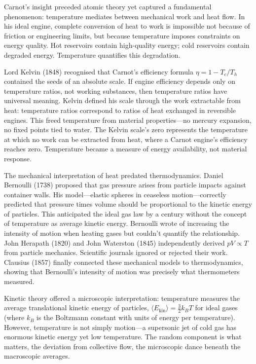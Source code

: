 Carnot's insight preceded atomic theory yet captured a fundamental phenomenon: temperature mediates between mechanical work and heat flow. In his ideal engine, complete conversion of heat to work is impossible not because of friction or engineering limits, but because temperature imposes constraints on energy quality. Hot reservoirs contain high-quality energy; cold reservoirs contain degraded energy. Temperature quantifies this degradation.

Lord Kelvin (1848) recognised that Carnot's efficiency formula $\eta = 1 - T_c/T_h$ contained the seeds of an absolute scale. If engine efficiency depends only on temperature ratios, not working substances, then temperature ratios have universal meaning. Kelvin defined his scale through the work extractable from heat: temperature ratios correspond to ratios of heat exchanged in reversible engines. This freed temperature from material properties—no mercury expansion, no fixed points tied to water. The Kelvin scale's zero represents the temperature at which no work can be extracted from heat, where a Carnot engine's efficiency reaches zero. Temperature became a measure of energy availability, not material response.

The mechanical interpretation of heat predated thermodynamics. Daniel Bernoulli (1738) proposed that gas pressure arises from particle impacts against container walls. His model—elastic spheres in ceaseless motion—correctly predicted that pressure times volume should be proportional to the kinetic energy of particles. This anticipated the ideal gas law by a century without the concept of temperature as average kinetic energy. Bernoulli wrote of \QSOpen{}increasing the intensity of motion\QSClose{} when heating gases but couldn't quantify the relationship. John Herapath (1820) and John Waterston (1845) independently derived $pV \propto T$ from particle mechanics. Scientific journals ignored or rejected their work. Clausius (1857) finally connected these mechanical models to thermodynamics, showing that Bernoulli's \QSOpen{}intensity of motion\QSClose{} was precisely what thermometers measured.

Kinetic theory offered a microscopic interpretation: temperature measures the average translational kinetic energy of particles, $ \langle E_{\text{kin}} \rangle = \frac{3}{2}k_B T $ for ideal gases (where $k_B$ is the Boltzmann constant with units of energy per temperature). However, temperature is not simply motion—a supersonic jet of cold gas has enormous kinetic energy yet low temperature. The random component is what matters, the deviation from collective flow, the microscopic dance beneath the macroscopic averages.

